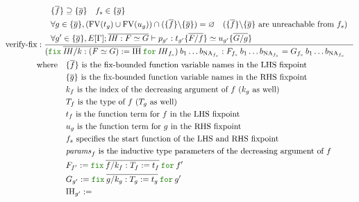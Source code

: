 \documentclass[a4paper,fleqn]{article}
\newcommand{\kwfix}{\mbox{\color{mygreen}\ttfamily fix}}
\newcommand{\kwfor}{\mbox{\color{mygreen}\ttfamily for}}
\DeclareMathOperator{\NA}{NA} %
\DeclareMathOperator{\FV}{FV}
\newcommand{\substm}[3]{#1\{\overline{#2/#3}\}}
\newcommand{\rep}[1]{\overline{#1}}
\begin{document}
\begin{gather*}
  \text{verify-fix}:
    \dfrac{
      \begin{aligned}
        & \{\rep{f}\} \supseteq \{\rep{g}\} \quad f_s \in  \{\rep{g}\} \\
        & \forall g \in \{\rep{g}\}, (\FV(t_g) \cup \FV(u_g)) \cap (\{\rep{f}\} \backslash \{\rep{g}\}) = \varnothing \quad \mbox{($\{\rep{f}\} \backslash \{\rep{g}\}$ are unreachable from $f_s$)} \\
        & \forall g' \in \{\rep{g}\}, E[\Gamma]; \rep{\mathit{IH} : F \simeq G} \vdash p_{g'} : \substm{t_{g'}}{F}{f} \simeq \substm{u_{g'}}{G}{g}
      \end{aligned}
    }{
      \begin{aligned}
        & (\kwfix\:\rep{\mathit{IH} / k : (F \simeq G) := \mathrm{IH}}\:\kwfor\:\mathit{IH}_{f_s})\:b_1 \ldots b_{\NA_{f_s}}
          : F_{f_s}\:b_1 \ldots b_{\NA_{f_s}} = G_{f_s}\:b_1 \ldots b_{\NA_{f_s}}
      \end{aligned}
    } \\
    \quad \mbox{where} \quad
      \begin{aligned}[t]
        & \mbox{$\{\rep{f}\}$ is the fix-bounded function variable names in the LHS fixpoint} \\
        & \mbox{$\{\rep{g}\}$ is the fix-bounded function variable names in the RHS fixpoint} \\
        & \mbox{$k_f$ is the index of the decreasing argument of $f$ ($k_g$ as well)} \\
        & \mbox{$T_f$ is the type of $f$ ($T_g$ as well)} \\
        & \mbox{$t_f$ is the function term for $f$ in the LHS fixpoint} \\
        & \mbox{$u_g$ is the function term for $g$ in the RHS fixpoint} \\
        & \mbox{$f_s$ specifies the start function of the LHS and RHS fixpoint} \\
        & \mbox{$\mathit{params}_f$ is the inductive type parameters of the decreasing argument of $f$} \\
        & F_{f'} := \kwfix\:\rep{f/k_f:T_f:=t_f}\:\kwfor\:{f'} \\
        & G_{g'} := \kwfix\:\rep{g/k_g:T_g:=t_g}\:\kwfor\:{g'} \\
        & \mathrm{IH}_{g'} :=
          \begin{aligned}[t]

\end{aligned}
\end{aligned}
\end{gather*}
\end{document}
